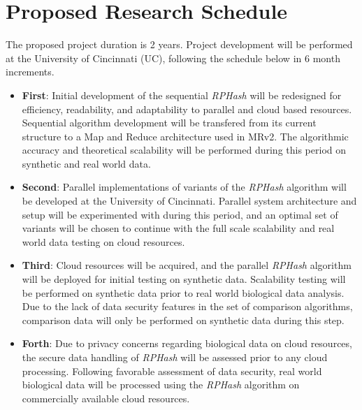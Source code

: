 \documentclass[a4paper,10pt]{article}
\begin{document}
\section{Proposed Research Schedule} The proposed project duration is 2
years.	Project development will be performed at the University of Cincinnati
(UC), following the schedule below in 6 month increments.  
\begin{itemize}
\item\textbf{First}: Initial development of the sequential \emph{RPHash} will
be redesigned for efficiency, readability, and adaptability to parallel and
cloud based resources.	Sequential algorithm development will be transfered
from its current structure to a Map and Reduce architecture used in MRv2.
The algorithmic accuracy and theoretical scalability will be performed during
this period on synthetic and real world data.

\item\textbf{Second}: Parallel implementations of variants of the \emph{RPHash}
algorithm will be developed at the University of Cincinnati.  Parallel system
architecture and setup will be experimented with during this period, and
an optimal set of variants will be chosen to continue with the full scale
scalability and real world data testing on cloud resources.

\item\textbf{Third}: Cloud resources will be acquired, and the parallel
\emph{RPHash} algorithm will be deployed for initial testing on synthetic data.
Scalability testing will be performed on synthetic data prior to real world
biological data analysis.  Due to the lack of data security features in
the set of comparison algorithms, comparison data will only be performed on
synthetic data during this step.

\item\textbf{Forth}: Due to privacy concerns regarding biological data on
cloud resources, the secure data handling of \emph{RPHash} will be assessed
prior to any cloud processing.	Following favorable assessment of data
security, real world biological data will be processed using the \emph{RPHash}
algorithm on commercially available cloud resources.  \end{itemize}
\newpage
{}


 \markright{ }
\end{document}
